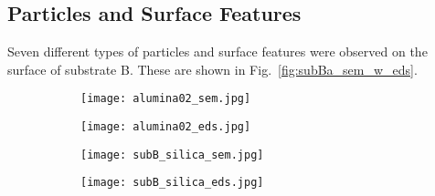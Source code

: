 \subsection{Particles and Surface Features}

Seven different types of particles and surface features were observed on the surface of substrate B. These are shown in Fig.~\ref{fig:subBa_sem_w_eds}.
\begin{figure}[htbp]
    \centering
    \begin{subfigure}[t]{\textwidth}
        \caption{}\label{fig:subBa_polishing-grit_alumina}
          \begin{minipage}[t]{0.43\linewidth}
            \centering
            \texttt{[image: alumina02\_sem.jpg]}
          \end{minipage}
          \hfill
          \begin{minipage}[t]{0.43\linewidth}
            \centering
            \texttt{[image: alumina02\_eds.jpg]}
          \end{minipage}
          \begin{minipage}[t]{0.11\linewidth}
            \centering
            \atomicTable[&][&][&]
          \end{minipage}
    \end{subfigure}%
    \par\bigskip
    \begin{subfigure}[t]{\textwidth}
        \caption{}\label{fig:subBa_polishing-grit_silica}
          \begin{minipage}[t]{0.43\linewidth}
            \centering
            \texttt{[image: subB\_silica\_sem.jpg]}
          \end{minipage}
          \hfill
          \begin{minipage}[t]{0.43\linewidth}
            \centering
            \texttt{[image: subB\_silica\_eds.jpg]}
          \end{minipage}
          \begin{minipage}[t]{0.11\linewidth}
            \centering
            \atomicTable[&][&][&]
          \end{minipage}
    \end{subfigure}%
    \par\bigskip
    \begin{subfigure}[t]{\textwidth}

\end{subfigure}
\end{figure}
